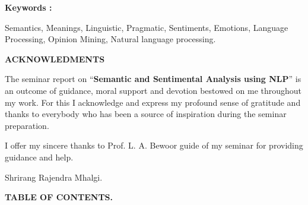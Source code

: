 \documentclass{article} %
\begin{document}
\noindent 

\noindent 

\noindent \textbf{}

\noindent \textbf{Keywords : }

\textbf{ }Semantics, Meanings, Linguistic, Pragmatic, Sentiments, Emotions, Language Processing, Opinion Mining, Natural language processing.

\noindent \textbf{}

\noindent \textbf{}

\noindent \textbf{}

\noindent \textbf{}

\noindent 

\noindent \eject 

\noindent \textbf{}

\noindent \textbf{\eject }

\noindent \textbf{ACKNOWLEDMENTS}

\noindent 

The seminar report on ``\textbf{Semantic and Sentimental Analysis using NLP}'' is an outcome of guidance, moral support and devotion bestowed on me throughout my work. For this I acknowledge and express my profound sense of gratitude and thanks to everybody who has been a source of inspiration during the seminar preparation. 

I offer my sincere thanks to Prof. L. A. Bewoor guide of my seminar for providing guidance and help.













Shrirang Rajendra Mhalgi.





\noindent \textbf{}

\noindent \textbf{\eject }

\noindent \textbf{}

\noindent \textbf{\eject }

\noindent \textbf{TABLE OF CONTENTS.}

\noindent 
\end{document}
